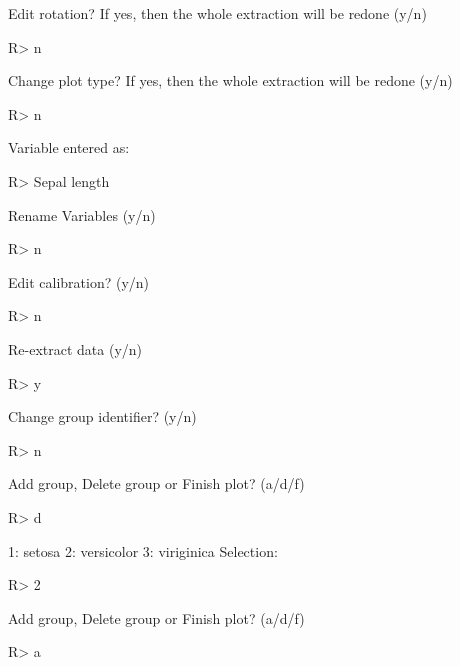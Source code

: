\documentclass[article]{jss}
\begin{document}
\begin{CodeChunk}

\begin{CodeOutput}
Edit rotation? If yes, then the whole extraction will be redone (y/n) 
\end{CodeOutput}
\begin{CodeInput}
R> n
\end{CodeInput}
\begin{CodeOutput}
Change plot type? If yes, then the whole extraction will be redone (y/n) 
\end{CodeOutput}
\begin{CodeInput}
R> n
\end{CodeInput}
\begin{CodeOutput}
Variable entered as: 
\end{CodeOutput}
\begin{CodeInput}
R> Sepal length
\end{CodeInput}
\begin{CodeOutput}
Rename Variables (y/n) 
\end{CodeOutput}
\begin{CodeInput}
R> n
\end{CodeInput}
\begin{CodeOutput}
Edit calibration? (y/n) 
\end{CodeOutput}
\begin{CodeInput}
R> n
\end{CodeInput}
\begin{CodeOutput}
Re-extract data (y/n) 
\end{CodeOutput}
\begin{CodeInput}
R> y
\end{CodeInput}
\begin{CodeOutput}
Change group identifier? (y/n) 
\end{CodeOutput}
\begin{CodeInput}
R> n
\end{CodeInput}
\begin{CodeOutput}
Add group, Delete group or Finish plot? (a/d/f) 
\end{CodeOutput}
\begin{CodeInput}
R> d
\end{CodeInput}
\begin{CodeOutput}
1: setosa
2: versicolor
3: viriginica
Selection: 
\end{CodeOutput}
\begin{CodeInput}
R> 2
\end{CodeInput}
\begin{CodeOutput}
Add group, Delete group or Finish plot? (a/d/f) 
\end{CodeOutput}
\begin{CodeInput}
R> a
\end{CodeInput}

\end{CodeChunk}
\end{document}
